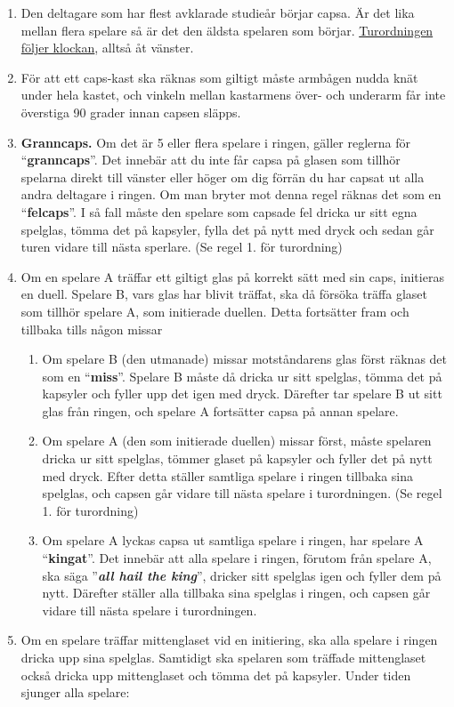 \begin{enumerate}
\def\labelenumi{\arabic{enumi}.}
\item
  Den deltagare som har flest avklarade studieår börjar capsa. Är det
  lika mellan flera spelare så är det den äldsta spelaren som börjar.
  \underline{Turordningen följer klockan}, alltså åt vänster.
\item
  För att ett caps-kast ska räknas som giltigt måste armbågen nudda knät
  under hela kastet, och vinkeln mellan kastarmens över- och underarm
  får inte överstiga 90 grader innan capsen släpps.
\item
  \textbf{Granncaps.} Om det är 5 eller flera spelare i ringen, gäller
  reglerna för ``\textbf{granncaps}''. Det innebär att du inte får capsa
  på glasen som tillhör spelarna direkt till vänster eller höger om dig
  förrän du har capsat ut alla andra deltagare i ringen. Om man bryter
  mot denna regel räknas det som en ``\textbf{felcaps}''. I så fall
  måste den spelare som capsade fel dricka ur sitt egna spelglas, tömma
  det på kapsyler, fylla det på nytt med dryck och sedan går turen
  vidare till nästa sperlare. (Se regel 1. för turordning)
\item
  Om en spelare A träffar ett giltigt glas på korrekt sätt med sin caps,
  initieras en duell. Spelare B, vars glas har blivit träffat, ska då
  försöka träffa glaset som tillhör spelare A, som initierade duellen.
  Detta fortsätter fram och tillbaka tills någon missar

  \begin{enumerate}
  \def\labelenumii{\alph{enumii}.}
  \item
    Om spelare B (den utmanade) missar motståndarens glas först räknas
    det som en ``\textbf{miss}''. Spelare B måste då dricka ur sitt
    spelglas, tömma det på kapsyler och fyller upp det igen med dryck.
    Därefter tar spelare B ut sitt glas från ringen, och spelare A
    fortsätter capsa på annan spelare.
  \item
    Om spelare A (den som initierade duellen) missar först, måste
    spelaren dricka ur sitt spelglas, tömmer glaset på kapsyler och
    fyller det på nytt med dryck. Efter detta ställer samtliga spelare i
    ringen tillbaka sina spelglas, och capsen går vidare till nästa
    spelare i turordningen. (Se regel 1. för turordning)
  \item
    Om spelare A lyckas capsa ut samtliga spelare i ringen, har spelare
    A ``\textbf{kingat}''. Det innebär att alla spelare i ringen,
    förutom från spelare A, ska säga ''\emph{\textbf{all hail the
    king}}'', dricker sitt spelglas igen och fyller dem på nytt.
    Därefter ställer alla tillbaka sina spelglas i ringen, och capsen
    går vidare till nästa spelare i turordningen.
  \end{enumerate}
\item
  Om en spelare träffar mittenglaset vid en initiering, ska alla spelare
  i ringen dricka upp sina spelglas. Samtidigt ska spelaren som träffade
  mittenglaset också dricka upp mittenglaset och tömma det på kapsyler.
  Under tiden sjunger alla spelare:
\end{enumerate}

